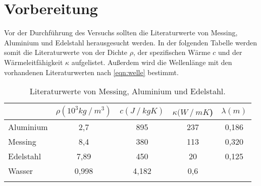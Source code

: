 \section{Vorbereitung}
\label{sec:Vorbereitung}

Vor der Durchführung des Versuchs sollten die Literaturwerte von Messing, Aluminium und Edelstahl herausgesucht werden.
In der folgenden Tabelle werden somit die Literaturwerte von der Dichte $\rho$, der spezifischen Wärme $c$ und der Wärmeleitfähigkeit $\kappa$ aufgelistet.
Außerdem wird die Wellenlänge mit den vorhandenen Literaturwerten nach \autoref{eqn:welle} bestimmt.

\begin{table}
    \centering
    \caption{Literaturwerte von Messing, Aluminium und Edelstahl.}
    \label{tab:Vorbereitung} 
    \begin{tabular}{
        l
        c
        c
        c
        c
        }
    \toprule
    & {$\rho (10^3\si{kg}\mathbin{/}\si{m^3})$} &{$c (\si{J}\mathbin{/}\si{kg}\si{K})$} & {$\kappa (\si{W}\mathbin{/}\si{mK}$)} & {$\lambda (\si{m})$}\\
    \midrule
        Aluminium & 2,7 & 895 & 237 & 0,186\\
        Messing & 8,4 & 380 & 113 & 0,320\\
        Edelstahl & 7,89 & 450 & 20 & 0,125 \\
        Wasser & 0,998 & 4,182 & 0,6 \\
    \bottomrule
    \cite[378,381]{PhyPrak} \cite{EdelWäLeit} 
    \end{tabular}
\end{table}